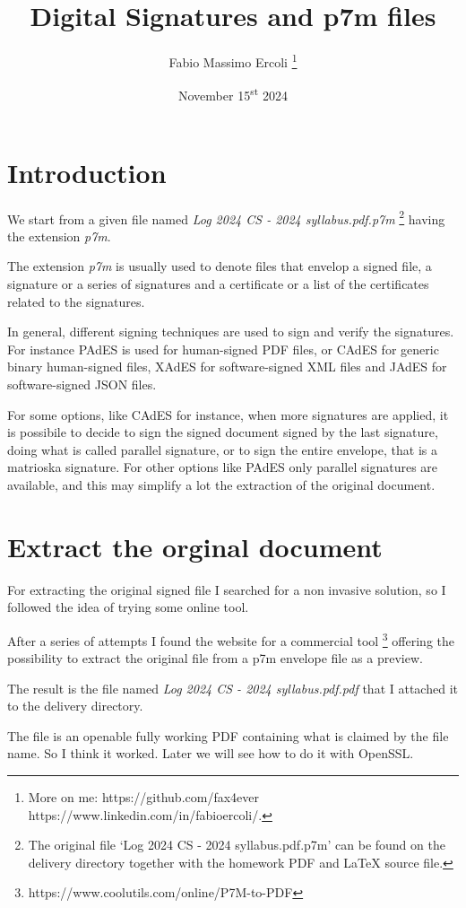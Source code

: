 \documentclass{article}
\title{Digital Signatures and p7m files}
\author{Fabio Massimo Ercoli
	\footnote{
		More on me:
		https://github.com/fax4ever
		https://www.linkedin.com/in/fabioercoli/.
}}
\date{November 15\textsuperscript{st} 2024}
\begin{document}
\maketitle
\thispagestyle{empty}

\section{Introduction}

We start from a given file named \emph{Log 2024 CS - 2024 syllabus.pdf.p7m}
\footnote{The original file `Log 2024 CS - 2024 syllabus.pdf.p7m'
can be found on the delivery directory together with the homework 
PDF and LaTeX source file.}
having the extension \emph{p7m}.

The extension \emph{p7m} is usually used to denote files that envelop a signed file, 
a signature or a series of signatures and a certificate or a list of the certificates 
related to the signatures.

In general, different signing techniques are used to sign and verify
the signatures. For instance PAdES is used for human-signed PDF files,
or CAdES for generic binary human-signed files, XAdES for software-signed
XML files and JAdES for software-signed JSON files.

For some options, like CAdES for instance, when more signatures are applied,
it is possibile to decide to sign the signed document signed by the last 
signature, doing what is called parallel signature, or to sign the entire 
envelope, that is a matrioska signature.
For other options like PAdES only parallel signatures are available,
and this may simplify a lot the extraction of the original document.

\section{Extract the orginal document}

For extracting the original signed file I searched for a non invasive solution,
so I followed the idea of trying some online tool.

After a series of attempts I found the website for a commercial tool
\footnote{https://www.coolutils.com/online/P7M-to-PDF}
offering the possibility to extract the original file 
from a p7m envelope file as a preview.

The result is the file named \emph{Log 2024 CS - 2024 syllabus.pdf.pdf}
that I attached it to the delivery directory.

The file is an openable fully working PDF containing what is claimed by the file name.
So I think it worked.
Later we will see how to do it with OpenSSL.
\end{document}
